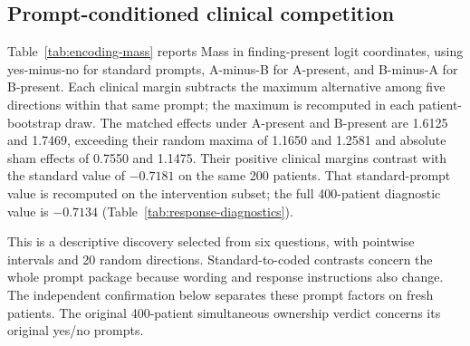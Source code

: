 \subsection{Prompt-conditioned clinical competition}

Table~\ref{tab:encoding-mass} reports Mass in finding-present logit
coordinates, using yes-minus-no for standard prompts, A-minus-B for
A-present, and B-minus-A for B-present. Each clinical margin subtracts the
maximum alternative among five directions within that same prompt; the
maximum is recomputed in each patient-bootstrap draw. The matched effects
under A-present and B-present are 1.6125 and 1.7469, exceeding their random
maxima of 1.1650 and 1.2581 and absolute sham effects of 0.7550 and 1.1475.
Their positive clinical margins contrast with the standard value of
$-0.7181$ on the same 200 patients. That standard-prompt value is recomputed
on the intervention subset; the full 400-patient diagnostic value is
$-0.7134$ (Table~\ref{tab:response-diagnostics}).



This is a descriptive discovery selected from six questions, with
pointwise intervals and 20 random directions. Standard-to-coded contrasts
concern the whole prompt package because wording and response instructions
also change. The independent confirmation below separates these prompt
factors on fresh patients. The original 400-patient simultaneous ownership
verdict concerns its original yes/no prompts.

\FloatBarrier
